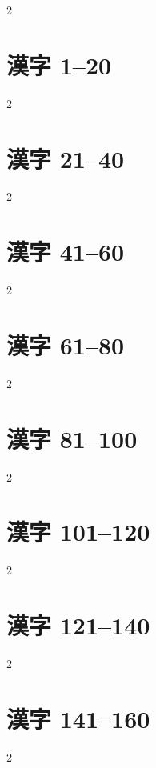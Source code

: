 \documentclass[10pt, a4paper]{ltjbook}
\begin{document}
\setlength{\columnseprule}{0.4pt}
\begin{multicols}{2}
    \vspace*{-4pt plus 10pt minus 10pt} %
	\listofglyph
\end{multicols}

\clearpage
{}

\setlength{\columnseprule}{0pt}

\chapter{漢字 1--20}
\begin{multicols}{2}


\chapter{漢字 21--40}
\begin{multicols}{2}


\chapter{漢字 41--60}
\begin{multicols}{2}


\chapter{漢字 61--80}
\begin{multicols}{2}


\chapter{漢字 81--100}
\begin{multicols}{2}


\chapter{漢字 101--120}
\begin{multicols}{2}


\chapter{漢字 121--140}
\begin{multicols}{2}


\chapter{漢字 141--160}
\begin{multicols}{2}



\end{multicols}
\end{multicols}
\end{multicols}
\end{multicols}
\end{multicols}
\end{multicols}
\end{multicols}
\end{multicols}
\end{document}
